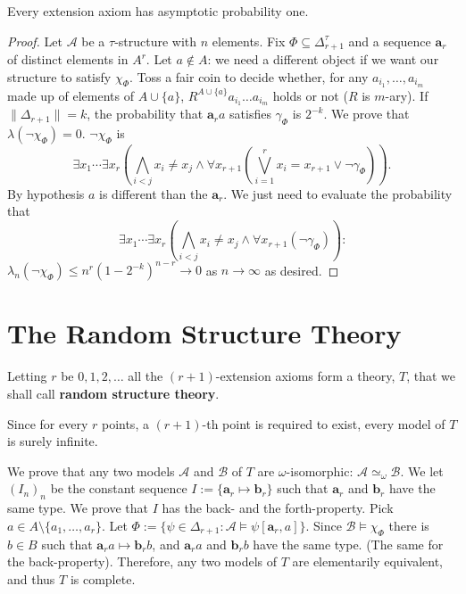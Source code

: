\begin{lem}
\label{extension}
Every extension axiom has asymptotic probability one.
\begin{proof} Let $\mathcal{A}$ be a $\tau$-structure with $n$ elements. Fix $\Phi \subseteq \Delta_{r+1}^ \tau$ and a sequence $\mathbf{a}_r$ of distinct elements in $A^r$. 
Let $a \notin A$: we need a different object if we want our structure to satisfy $\chi_{\Phi}$. 
Toss a fair coin to decide whether, for any $a_{i_1},\ldots, a_{i_m}$ made up of elements of $A \cup \{a\}$, $R^{A \cup \{a\}} a_{i_1} \ldots a_{i_m}$ holds or not ($R$ is $m$-ary). 
If $\lVert \Delta_{r+1} \rVert = k$, the probability that $\mathbf{a}_r a$ satisfies $\gamma_{\Phi}$ is $2^{-k}$. 
We prove that $\lambda (\lnot \chi_{\Phi})=0$. 
$\lnot \chi_{\Phi}$ is 
$$\exists x_1 \cdots \exists x_r \left (\bigwedge_{i<j} x_i \neq x_j \land \forall x_{r+1} \left (\bigvee_{i=1} ^r x_i = x_{r+1} \lor \lnot \gamma_{\Phi}\right)\right) \text{.}
$$
By hypothesis $a$ is different than the $\mathbf{a}_r$. 
We just need to evaluate the probability that 
$$\exists x_1 \cdots \exists x_r \left (\bigwedge_{i<j} x_i \neq x_j \land \forall x_{r+1} \left ( \lnot \gamma_{\Phi}\right)\right) \text{:}
$$
$\lambda_n(\lnot \chi_{\Phi}) \le n^r (1-2^{-k})^{n-r} \to 0$ as $ n \to \infty$ as desired.
\end{proof}
\end{lem} 

\section{The Random Structure Theory}
Letting $r$ be $0, 1, 2, \ldots$ all the $({r+1})$-extension axioms form a theory, $T$, that we shall call \textbf{random structure theory}.

Since for every $r$ points, a $(r+1)$-th point is required to exist, every model of $T$ is surely infinite. 

We prove that any two models $\mathcal{A}$ and $\mathcal{B}$ of $T$ are $\omega$-isomorphic: $\mathcal{A} \simeq_{\omega} \mathcal{B}$. 
We let $(I_n)_n $ be the constant sequence $I := \{\mathbf{a}_r \mapsto \mathbf{b}_r \}$ such that $\mathbf{a}_r $ and $ \mathbf{b}_r$ have the same type. We prove that $I$ has the back- and the forth-property. 
Pick $a \in A \setminus \{a_1, \ldots, a_r\}$. 
Let 
$\Phi :=\{ \psi \in \Delta_{r+1} : \mathcal{A} \models \psi[\mathbf{a}_r,a] \}$. 
Since $\mathcal{B} \models \chi_{\Phi}$ there is $ b \in B$ such that $\mathbf{a}_r a \mapsto \mathbf{b}_r b$, and $\mathbf{a}_r a$ and $\mathbf{b}_r b$ have the same type. 
(The same for the back-property). 
Therefore, any two models of $T$ are elementarily equivalent, and thus $T$ is complete.

